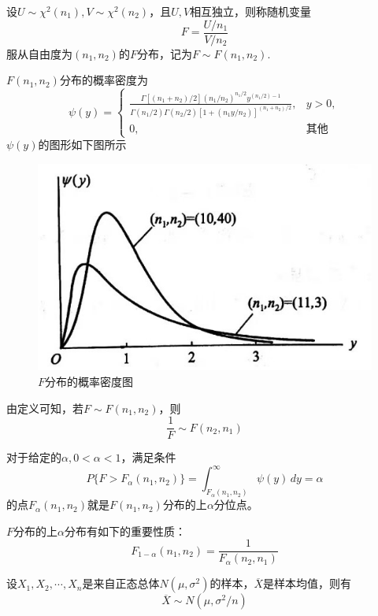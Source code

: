 \begin{definition}[$F$分布]
    设$U\sim \chi^2(n_1),V\sim \chi^2(n_2)$，且$U,V$相互独立，则称随机变量
    $$F=\frac{U/n_1}{V/n_2}$$
    服从自由度为$(n_1,n_2)$的{\heiti $F$分布}，记为$F\sim F(n_1,n_2)$.

    $F(n_1,n_2)$分布的概率密度为
    $$\psi (y)=\left\{\begin{array}{ll}
        \frac{\Gamma[(n_1+n_2)/2](n_1/n_2)^{n_1/2} y^{(n_1/2)-1}}{\Gamma(n_1/2)\Gamma(n_2/2)[1+(n_1y/n_2)]^{(n_1+n_2)/2}}, & y>0,\\
        0, & \mbox{其他} 
    \end{array}\right.$$
    $\psi(y)$的图形如下图所示
    \begin{figure}[H]
        \centering
        \includegraphics[scale=0.5]{3.jpg}
        \caption{$F$分布的概率密度图}
    \end{figure} 

    由定义可知，若$F\sim F(n_1,n_2)$，则
    $$\frac{1}{F}\sim F(n_2,n_1)$$
\end{definition}

\begin{definition}[$F$分布的上分位点]
    对于给定的$\alpha,0<\alpha<1$，满足条件
    $$P\{F>F_\alpha(n_1,n_2)\}=\int_{F_\alpha(n_1,n_2)}^\infty \psi(y)\,dy=\alpha$$
    的点$F_\alpha(n_1,n_2)$就是$F(n_1,n_2)$分布的上$\alpha$分位点。

    $F$分布的上$\alpha$分布有如下的重要性质：
    $$F_{1-\alpha}(n_1,n_2)=\frac{1}{F_\alpha(n_2,n_1)}$$
\end{definition}

\begin{theorem}
    设$X_1,X_2,\cdots,X_n$是来自正态总体$N(\mu,\sigma^2)$的样本，$\overline{X}$是样本均值，则有
    $$\overline{X}\sim N(\mu,\sigma^2/n)$$
\end{theorem}

